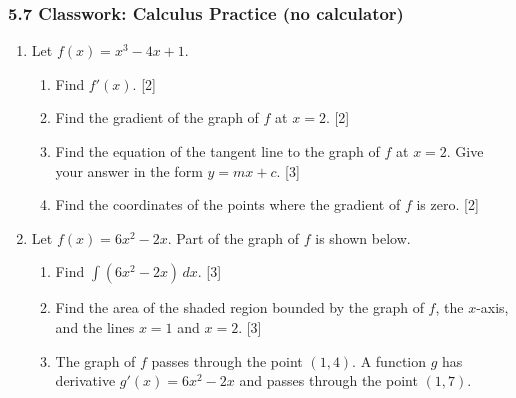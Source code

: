 \documentclass[12pt, twoside]{article}
\begin{document}
\subsubsection*{5.7 Classwork: Calculus Practice (no calculator)}

\begin{enumerate}[itemsep=0.2cm]

\item Let $f(x) = x^3 - 4x + 1$.

\begin{enumerate}[itemsep=0.15cm]
  \item Find $f'(x)$. \hfill [2]
  \item Find the gradient of the graph of $f$ at $x = 2$. \hfill [2]
  \item Find the equation of the tangent line to the graph of $f$ at $x = 2$.
        Give your answer in the form $y = mx + c$. \hfill [3]
  \item Find the coordinates of the points where the gradient of $f$ is zero. \hfill [2]
\end{enumerate}


\newpage

\item Let $f(x) = 6x^2 - 2x$. Part of the graph of $f$ is shown below.

\begin{center}
\end{center}

\begin{enumerate}[itemsep=0.15cm]
  \item Find $\displaystyle\int (6x^2 - 2x)\,dx$. \hfill [3]
  \item Find the area of the shaded region bounded by the graph of $f$,
        the $x$-axis, and the lines $x = 1$ and $x = 2$. \hfill [3]
  \item The graph of $f$ passes through the point $(1, 4)$.
        A function $g$ has derivative $g'(x) = 6x^2 - 2x$ and passes through
        the point $(1, 7)$.


\end{enumerate}
\end{enumerate}
\end{document}
